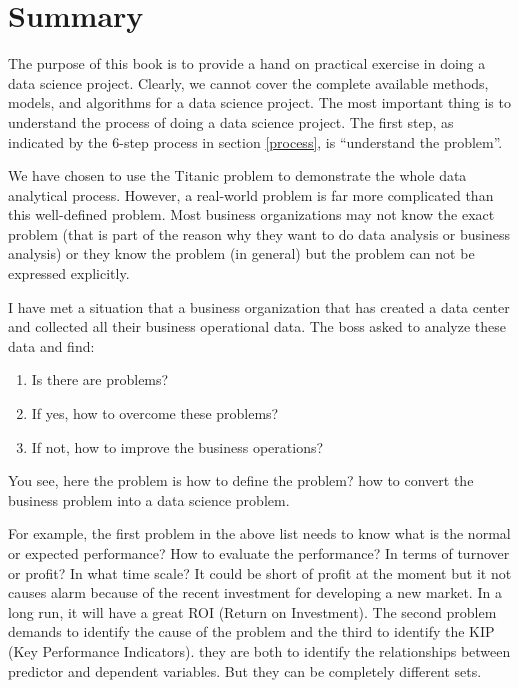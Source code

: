 \documentclass[
]{book}
\providecommand{\tightlist}{%
  \setlength{\itemsep}{0pt}\setlength{\parskip}{0pt}}
\begin{document}
\hypertarget{summary-1}{%
\section*{Summary}\label{summary-1}}


The purpose of this book is to provide a hand on practical exercise in doing a data science project. Clearly, we cannot cover the complete available methods, models, and algorithms for a data science project. The most important thing is to understand the process of doing a data science project. The first step, as indicated by the 6-step process in section \ref{process}, is ``understand the problem''.

We have chosen to use the Titanic problem to demonstrate the whole data analytical process. However, a real-world problem is far more complicated than this well-defined problem. Most business organizations may not know the exact problem (that is part of the reason why they want to do data analysis or business analysis) or they know the problem (in general) but the problem can not be expressed explicitly.

I have met a situation that a business organization that has created a data center and collected all their business operational data. The boss asked to analyze these data and find:

\begin{enumerate}
\def\labelenumi{\arabic{enumi}.}
\tightlist
\item
  Is there are problems?
\item
  If yes, how to overcome these problems?
\item
  If not, how to improve the business operations?
\end{enumerate}

You see, here the problem is how to define the problem? how to convert the business problem into a data science problem.

For example, the first problem in the above list needs to know what is the normal or expected performance? How to evaluate the performance? In terms of turnover or profit? In what time scale? It could be short of profit at the moment but it not causes alarm because of the recent investment for developing a new market. In a long run, it will have a great ROI (Return on Investment). The second problem demands to identify the cause of the problem and the third to identify the KIP (Key Performance Indicators). they are both to identify the relationships between predictor and dependent variables. But they can be completely different sets.
\end{document}
